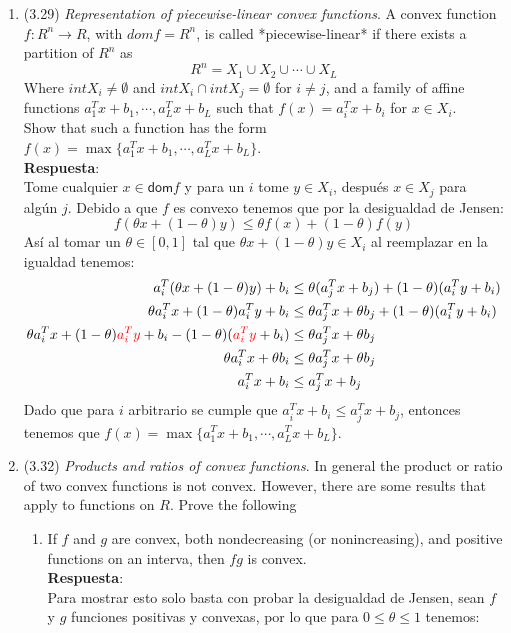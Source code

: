\documentclass[12pt, oneside]{article}%
\begin{document}
\begin{enumerate}
\item (3.29) \textit{Representation of piecewise-linear convex functions}. A convex function $f: R^n \rightarrow R$, with $dom f = R^n$, is called *piecewise-linear* if there exists a partition of $R^n$ as
$$R^n = X_1 \cup X_2 \cup \cdots \cup X_L$$
Where $int X_i \neq \emptyset$ and $int X_i \cap int X_j = \emptyset$ for $i \neq j$, and a family of affine functions $a_1^Tx + b_1, \cdots , a_L^Tx + b_L$ such that $f(x) = a_i^Tx + b_i$ for $x\in X_i$.\\
Show that such a function has the form $f(x) = \max \{a_1^Tx + b_1, \cdots , a_L^Tx + b_L\}$.\\
\textbf{Respuesta}: \\
Tome cualquier $x \in \textsf{dom}f$ y para un $i$ tome $y\in X_i$, después $x\in X_j$ para algún $j$. Debido a que $f$ es convexo tenemos que por la desigualdad de Jensen:
$$f(\theta x+(1-\theta)y)\leq \theta f(x)+(1-\theta)f(y)$$
Así al tomar un $\theta\in[0,1]$ tal que $\theta x+(1-\theta)y\in X_i$ al reemplazar en la igualdad tenemos:
\begin{align*}
    a_i^T(\theta x+(1-\theta)y)+b_i &\leq \theta (a_j^Tx+b_j)+(1-\theta)(a_i^Ty+b_i)\\
    \theta a_i^Tx+(1-\theta)a_i^Ty+b_i &\leq \theta a_j^Tx+\theta b_j+(1-\theta)(a_i^Ty+b_i)\\
    \theta a_i^Tx+(1-\theta)\textcolor{red}{a_i^Ty}+b_i -(1-\theta)(\textcolor{red}{a_i^Ty}+b_i) &\leq \theta a_j^Tx+\theta b_j\\
    \theta a_i^Tx+\theta b_i  &\leq \theta a_j^Tx+\theta b_j\\
    a_i^Tx+ b_i  &\leq  a_j^Tx+ b_j\\
\end{align*}
Dado que para $i$ arbitrario se cumple que $a_i^Tx+ b_i  \leq  a_j^Tx+ b_j$, entonces tenemos que $f(x) = \max \{a_1^Tx + b_1, \cdots , a_L^Tx + b_L\}$.
\item (3.32) \textit{Products and ratios of convex functions}. In general the product or ratio of two convex functions is not convex. However, there are some results that apply to functions on $R$. Prove the following
\begin{enumerate}

    \item If $f$ and $g$ are convex, both nondecreasing (or nonincreasing), and positive functions on an interva, then $fg$ is convex.\\
    \textbf{Respuesta}: \\
    Para mostrar esto solo basta con probar la desigualdad de Jensen, sean $f$ y $g$ funciones positivas y convexas, por lo que para $0\leq \theta \leq 1$ tenemos:
    

\end{enumerate}
\end{enumerate}
\end{document}
